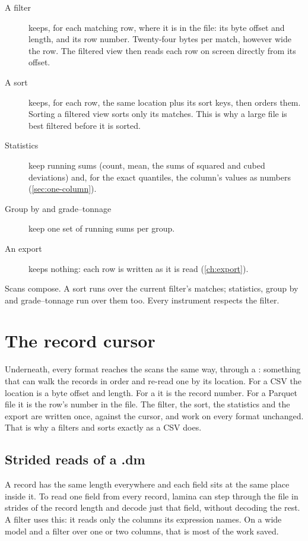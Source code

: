 \begin{description}
\item[A filter] keeps, for each matching row, where it is in the file: its byte offset and length, and
its row number. Twenty-four bytes per match, however wide the row. The filtered view then reads each
row on screen directly from its offset.
\item[A sort] keeps, for each row, the same location plus its sort keys, then orders them. Sorting a
filtered view sorts only its matches. This is why a large file is best filtered before it is sorted.
\item[Statistics] keep running sums (count, mean, the sums of squared and cubed deviations) and, for
the exact quantiles, the column's values as numbers (\cref{sec:one-column}).
\item[Group by and grade–tonnage] keep one set of running sums per group.
\item[An export] keeps nothing: each row is written as it is read (\cref{ch:export}).
\end{description}

Scans compose. A sort runs over the current filter's matches; statistics, group by and grade–tonnage
run over them too. Every instrument respects the filter.

\section{The record cursor}\label{sec:cursor}

Underneath, every format reaches the scans the same way, through a : something that
can walk the records in order and re-read one by its location. For a CSV the location is a byte offset
and length. For a  it is the record number. For a Parquet file it is the row's number in the
file. The filter, the sort, the statistics and the export are written once, against the cursor, and
work on every format unchanged. That is why a  filters and sorts exactly as a CSV does.

\subsection{Strided reads of a .dm}\label{sec:strided}

A  record has the same length everywhere and each field sits at the same place inside it. To
read one field from every record, lamina can step through the file in strides of the record length and
decode just that field, without decoding the rest. A filter uses this: it reads only the columns its
expression names. On a wide model and a filter over one or two columns, that is most of the work saved.

